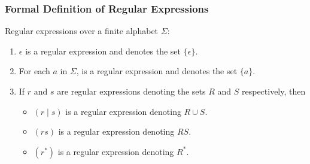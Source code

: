 \begin{frame}[fragile]
  \frametitle{Formal Definition of Regular Expressions}

Regular expressions over a finite alphabet $\Sigma$:
\begin{enumerate}
\item $\epsilon$ is a regular expression and denotes the set
  $\{\epsilon\}$.
\item For each $a$ in $\Sigma$,  is a regular expression and
  denotes the set $\{a\}$.
\item If $r$ and $s$ are regular expressions denoting the sets $R$ and
  $S$ respectively, then 
  \begin{itemize}
    \item $(r \mid s)$ is a regular expression denoting $R \cup S$.
    \item $(rs)$ is a regular expression denoting $RS$.
    \item $(r^*)$ is a regular expression denoting $R^*$.
  \end{itemize}

\end{enumerate}
\end{frame}

